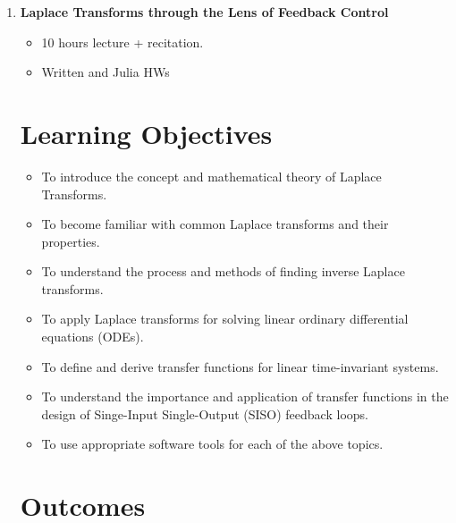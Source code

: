 \documentclass[letterpaper]{book}
\begin{document}
\begin{enumerate}[label={\large\arabic*}, font=\large]
\bigskip


% 

\item {\Large \bf Laplace Transforms through the Lens of Feedback Control}
\begin{itemize}
    \item 10 hours lecture + recitation.
    \item Written and Julia HWs
\end{itemize}

\section*{Learning Objectives}

\begin{itemize}
    \item To introduce the concept and mathematical theory of Laplace Transforms.
    \item To become familiar with common Laplace transforms and their properties.
    \item To understand the process and methods of finding inverse Laplace transforms.
    \item To apply Laplace transforms for solving linear ordinary differential equations (ODEs).
    \item To define and derive transfer functions for linear time-invariant systems.
    \item To understand the importance and application of transfer functions in the design of Singe-Input Single-Output (SISO) feedback loops.
    \item To use appropriate software tools for each of the above topics.
\end{itemize}

\section*{Outcomes}


\end{enumerate}
\end{document}
